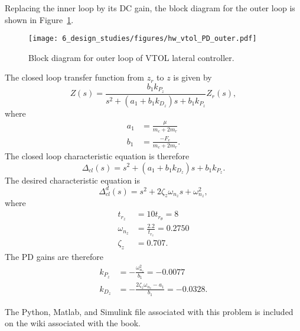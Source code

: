 Replacing the inner loop by its DC gain, the block diagram for the outer loop is shown in Figure~\ref{fig:hw_vtol_PD_outer}.
\begin{figure}[H]
   \centering
   \texttt{[image: 6\_design\_studies/figures/hw\_vtol\_PD\_outer.pdf]}
   \caption{Block diagram for outer loop of VTOL lateral controller.}
   \label{fig:hw_vtol_PD_outer}
\end{figure}
The closed loop transfer function from $z_r$ to $z$ is given by
\[
Z(s) = \frac{b_1k_{P_z}}{s^2+(a_1+b_1k_{D_z})s+b_1k_{P_z}}Z_r(s),
\]
where
\begin{align*}
a_1 &= \frac{\mu}{m_c+2m_r} \\
b_1 &= \frac{-F_e}{m_c+2m_r}.
\end{align*}
The closed loop characteristic equation is therefore
\[
\Delta_{cl}(s) = s^2+(a_1+b_1k_{D_z})s+b_1k_{P_z}.
\]
The desired characteristic equation is 
\[
\Delta_{cl}^d(s) = s^2 + 2\zeta_z\omega_{n_z}s + \omega_{n_z}^2,
\]
where
\begin{align*}
t_{r_z} &= 10 t_{r_\theta} = 8 \\
\omega_{n_z} &= \frac{2.2}{t_{r_z}} = 0.2750 \\
\zeta_z &= 0.707.
\end{align*}
The PD gains are therefore
\begin{align*}
k_{P_z} &= -\frac{\omega_{n_z}^2}{b_1} = -0.0077 \\
k_{D_z} &= -\frac{2\zeta_z\omega_{n_z}-a_1}{b_1} = -0.0328.
\end{align*}


The Python, Matlab, and Simulink file associated with this problem is included on the wiki associated with the book.
    